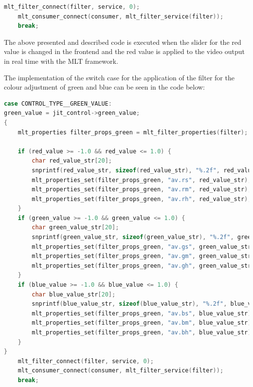 \documentclass[../MasterThesis.tex]{subfiles}
\begin{document}
\begin{lstlisting}[language=c, numbers=none, columns=fullflexible]
	mlt_filter_connect(filter, service, 0);
	mlt_consumer_connect(consumer, mlt_filter_service(filter));
	break;			
\end{lstlisting}

The above presented and described code is executed when the slider for the red value is changed in the frontend and the red value is applied to the video output in real time with the MLT framework.

The implementation of the switch case for the application of the filter for the colour adjustment of green and blue can be seen in the code below:


\begin{lstlisting}[language=c, numbers=none, columns=fullflexible]
case CONTROL_TYPE__GREEN_VALUE:
green_value = jit_control->green_value;
{
	mlt_properties filter_props_green = mlt_filter_properties(filter);
	
	if (red_value >= -1.0 && red_value <= 1.0) {
		char red_value_str[20]; 
		snprintf(red_value_str, sizeof(red_value_str), "%.2f", red_value);
		mlt_properties_set(filter_props_green, "av.rs", red_value_str);
		mlt_properties_set(filter_props_green, "av.rm", red_value_str);
		mlt_properties_set(filter_props_green, "av.rh", red_value_str);
	}	
	if (green_value >= -1.0 && green_value <= 1.0) {
		char green_value_str[20]; 
		snprintf(green_value_str, sizeof(green_value_str), "%.2f", green_value);
		mlt_properties_set(filter_props_green, "av.gs", green_value_str);
		mlt_properties_set(filter_props_green, "av.gm", green_value_str);
		mlt_properties_set(filter_props_green, "av.gh", green_value_str);
	}		
	if (blue_value >= -1.0 && blue_value <= 1.0) {
		char blue_value_str[20]; 
		snprintf(blue_value_str, sizeof(blue_value_str), "%.2f", blue_value);
		mlt_properties_set(filter_props_green, "av.bs", blue_value_str);
		mlt_properties_set(filter_props_green, "av.bm", blue_value_str);
		mlt_properties_set(filter_props_green, "av.bh", blue_value_str);
	}		
}	
	mlt_filter_connect(filter, service, 0);
	mlt_consumer_connect(consumer, mlt_filter_service(filter));
	break;

\end{lstlisting}

\end{document}
